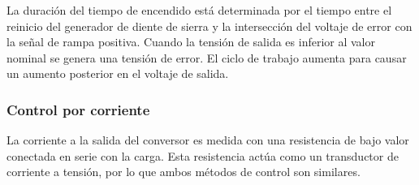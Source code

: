 La duración del tiempo de encendido está determinada por el tiempo entre el reinicio del generador de diente de sierra
y la intersección del voltaje de error con la señal de rampa positiva. 
Cuando la tensión de salida es inferior al valor nominal se genera una tensión de error. 
El ciclo de trabajo aumenta para causar un aumento posterior en el voltaje de salida. 

\subsubsection{Control por corriente}
La corriente a la salida del conversor es medida con una resistencia de bajo valor conectada en serie con la carga.
Esta resistencia actúa como un transductor de corriente a tensión, por lo que ambos métodos de control son similares.



